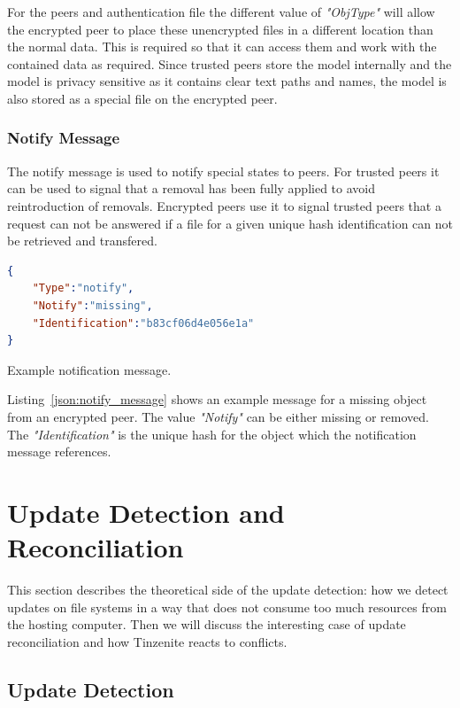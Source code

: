 For the peers and authentication file the different value of \textit{"ObjType"} will allow the encrypted peer to place these unencrypted files in a different location than the normal data.
This is required so that it can access them and work with the contained data as required.
Since trusted peers store the model internally and the model is privacy sensitive as it contains clear text paths and names, the model is also stored as a special file on the encrypted peer.

\subsubsection{Notify Message}
\label{subs:Notify Message}

The notify message is used to notify special states to peers.
For trusted peers it can be used to signal that a removal has been fully applied to avoid reintroduction of removals.
Encrypted peers use it to signal trusted peers that a request can not be answered if a file for a given unique hash identification can not be retrieved and transfered.

\begin{listing}[htp]
    \begin{lstlisting}[language=json,firstnumber=0]
{
    "Type":"notify",
    "Notify":"missing",
    "Identification":"b83cf06d4e056e1a"
}
    \end{lstlisting}
\caption[Notify Message]{Example notification message.}
\label{json:notify_message}
\end{listing}

Listing~\ref{json:notify_message} shows an example message for a missing object from an encrypted peer.
The value \textit{"Notify"} can be either missing or removed.
The \textit{"Identification"} is the unique hash for the object which the notification message references.

\section{Update Detection and Reconciliation}
\label{sec:Update Detection and Reconciliation}

This section describes the theoretical side of the update detection: how we detect updates on file systems in a way that does not consume too much resources from the hosting computer.
Then we will discuss the interesting case of update reconciliation and how Tinzenite reacts to conflicts.

\subsection{Update Detection}
\label{sub:Update Detection}

